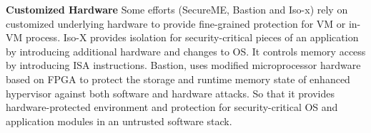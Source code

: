 \documentclass[conference]{IEEEtran}
\begin{document}
\textbf{Customized Hardware }
Some efforts (SecureME\cite{Chhabra2011SecureME}, Bastion\cite{Champagne2010Scalable} and Iso-x\cite{Evtyushkin2015Iso}) rely on 
customized underlying hardware to provide fine-grained protection for VM or in-VM process. 
Iso-X provides isolation for security-critical pieces of an application by introducing additional hardware and changes to OS. It controls memory access by introducing ISA instructions. 
Bastion, uses modified microprocessor hardware based on FPGA to protect the storage and runtime memory state of enhanced hypervisor against both software and hardware attacks. So that it provides hardware-protected environment and protection for security-critical OS and application modules in an untrusted software stack. 



\end{document}
